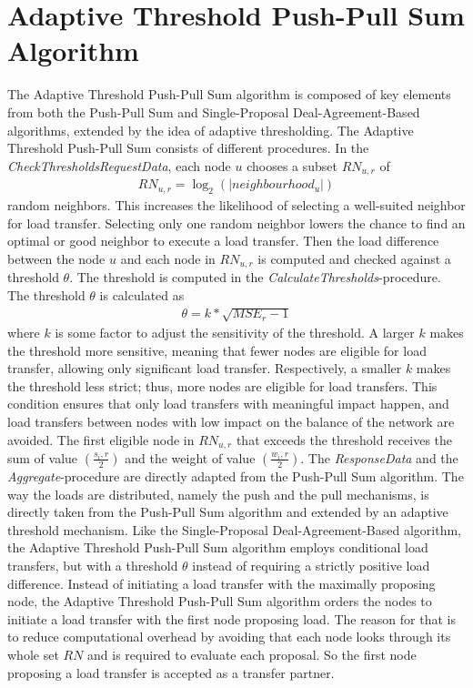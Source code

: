\section{Adaptive Threshold Push-Pull Sum Algorithm}\label{sec:adaptivethresholdPPS}
The Adaptive Threshold Push-Pull Sum algorithm is composed of key elements from both the Push-Pull Sum and Single-Proposal Deal-Agreement-Based algorithms, extended by the idea of adaptive thresholding. The Adaptive Threshold Push-Pull Sum consists of different procedures. In the \textit{CheckThresholdsRequestData}, each node $u$ chooses a subset $RN_{u,r}$ of 
\begin{align}
    RN_{u,r} = \log_{2}{(|neighbourhood_{u}|)}    
\end{align}
random neighbors. This increases the likelihood of selecting a well-suited neighbor for load transfer. Selecting only one random neighbor lowers the chance to find an optimal or good neighbor to execute a load transfer. Then the load difference between the node $u$ and each node in $RN_{u,r}$ is computed and checked against a threshold $\theta$. The threshold is computed in the \textit{CalculateThresholds}-procedure. The threshold $\theta$ is calculated as 
\begin{align}
    \theta = k*\sqrt{MSE_r-1}    
\end{align}
where $k$ is some factor to adjust the sensitivity of the threshold. A larger $k$ makes the threshold more sensitive, meaning that fewer nodes are eligible for load transfer, allowing only significant load transfer. Respectively, a smaller $k$ makes the threshold less strict; thus, more nodes are eligible for load transfers. This condition ensures that only load transfers with meaningful impact happen, and load transfers between nodes with low impact on the balance of the network are avoided. The first eligible node in $RN_{u,r}$ that exceeds the threshold receives the sum of value $(\frac{s_i,r}{2})$ and the weight of value $(\frac{w_i,r}{2})$. The \textit{ResponseData} and the \textit{Aggregate}-procedure are directly adapted from the Push-Pull Sum algorithm. The way the loads are distributed, namely the push and the pull mechanisms, is directly taken from the Push-Pull Sum algorithm and extended by an adaptive threshold mechanism. Like the Single-Proposal Deal-Agreement-Based algorithm, the Adaptive Threshold Push-Pull Sum algorithm employs conditional load transfers, but with a threshold $\theta$ instead of requiring a strictly positive load difference. Instead of initiating a load transfer with the maximally proposing node, the Adaptive Threshold Push-Pull Sum algorithm orders the nodes to initiate a load transfer with the first node proposing load. The reason for that is to reduce computational overhead by avoiding that each node looks through its whole set $RN$ and is required to evaluate each proposal. So the first node proposing a load transfer is accepted as a transfer partner.

